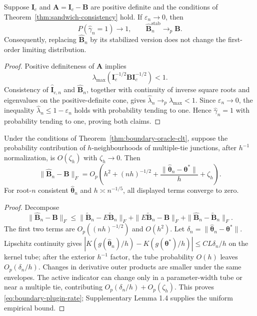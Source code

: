 \begin{proposition}
\label{prop:stabilization-inactive}
Suppose $\mathbf{I}_c$ and
$\mathbf{A}=\mathbf{I}_c-\mathbf{B}$ are positive definite and the conditions of
Theorem~\ref{thm:sandwich-consistency} hold.  If
$\varepsilon_n\to0$, then
\begin{equation}
 P(\widehat\gamma_n=1)\to1,
 \qquad
 \widehat{\mathbf{B}}_n^{\mathrm{stab}}\to_p\mathbf{B}.
 \label{eq:stabilization-inactive}
\end{equation}
Consequently, replacing $\widehat{\mathbf B}_n$ by its stabilized version does
not change the first-order limiting distribution.
\end{proposition}

\begin{proof}
Positive definiteness of $\mathbf{A}$ implies
\[
 \lambda_{\max}(\mathbf{I}_c^{-1/2}\mathbf{B}
                         \mathbf{I}_c^{-1/2})<1.
\]
Consistency of $\widehat{\mathbf I}_{c,n}$ and
$\widehat{\mathbf B}_n$, together with continuity of inverse square roots and
eigenvalues on the positive-definite cone, gives
$\widehat\lambda_n\to_p\lambda_{\max}<1$.  Since
$\varepsilon_n\to0$, the inequality
$\widehat\lambda_n\leq1-\varepsilon_n$ holds with probability tending to one.
Hence $\widehat\gamma_n=1$ with probability tending to one, proving both
claims.
\end{proof}

\begin{proposition}
\label{prop:boundary-plugin-rate}
Under the conditions of Theorem~\ref{thm:boundary-oracle-clt}, suppose the
probability contribution of $h$-neighbourhoods of multiple-tie junctions,
after $h^{-1}$ normalization, is $O(\zeta_h)$ with $\zeta_h\to0$.  Then
\begin{equation}
 \|\widehat{\mathbf{B}}_n-\mathbf{B}\|_F
 =O_p\!\left(
 h^2+(nh)^{-1/2}
 +\frac{\|\widehat{\boldsymbol{\theta}}_n
             -\boldsymbol{\theta}^*\|}{h}
 +\zeta_h
 \right).
 \label{eq:boundary-plugin-rate}
\end{equation}
For root-$n$ consistent $\widehat{\boldsymbol{\theta}}_n$ and
$h\asymp n^{-1/5}$, all displayed terms converge to zero.
\end{proposition}

\begin{proof}
Decompose
\[
 \|\widehat{\mathbf B}_n-\mathbf B\|_F
 \leq\|\widetilde{\mathbf B}_n-E\widetilde{\mathbf B}_n\|_F
 +\|E\widetilde{\mathbf B}_n-\mathbf B\|_F
 +\|\widehat{\mathbf B}_n-\widetilde{\mathbf B}_n\|_F.
\]
The first two terms are $O_p((nh)^{-1/2})$ and $O(h^2)$. Let
$\delta_n=\|\widehat{\boldsymbol\theta}_n-\boldsymbol\theta^*\|$. Lipschitz
continuity gives
$|K(g(\widehat{\boldsymbol\theta}_n)/h)-K(g(\boldsymbol\theta^*)/h)|
\leq C L\delta_n/h$ on the kernel tube; after the exterior $h^{-1}$ factor,
the tube probability $O(h)$ leaves $O_p(\delta_n/h)$. Changes in derivative
outer products are smaller under the same envelopes. The active indicator can
change only in a parameter-width tube or near a multiple tie, contributing
$O_p(\delta_n/h)+O_p(\zeta_h)$. This proves \eqref{eq:boundary-plugin-rate};
Supplementary Lemma 1.4 supplies the uniform empirical bound.
\end{proof}

